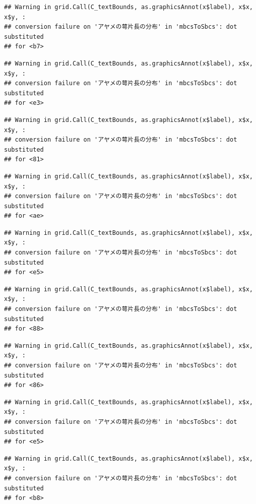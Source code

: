 \documentclass[
]{book}
\begin{document}
\begin{verbatim}
## Warning in grid.Call(C_textBounds, as.graphicsAnnot(x$label), x$x, x$y, :
## conversion failure on 'アヤメの萼片長の分布' in 'mbcsToSbcs': dot substituted
## for <b7>
\end{verbatim}

\begin{verbatim}
## Warning in grid.Call(C_textBounds, as.graphicsAnnot(x$label), x$x, x$y, :
## conversion failure on 'アヤメの萼片長の分布' in 'mbcsToSbcs': dot substituted
## for <e3>
\end{verbatim}

\begin{verbatim}
## Warning in grid.Call(C_textBounds, as.graphicsAnnot(x$label), x$x, x$y, :
## conversion failure on 'アヤメの萼片長の分布' in 'mbcsToSbcs': dot substituted
## for <81>
\end{verbatim}

\begin{verbatim}
## Warning in grid.Call(C_textBounds, as.graphicsAnnot(x$label), x$x, x$y, :
## conversion failure on 'アヤメの萼片長の分布' in 'mbcsToSbcs': dot substituted
## for <ae>
\end{verbatim}

\begin{verbatim}
## Warning in grid.Call(C_textBounds, as.graphicsAnnot(x$label), x$x, x$y, :
## conversion failure on 'アヤメの萼片長の分布' in 'mbcsToSbcs': dot substituted
## for <e5>
\end{verbatim}

\begin{verbatim}
## Warning in grid.Call(C_textBounds, as.graphicsAnnot(x$label), x$x, x$y, :
## conversion failure on 'アヤメの萼片長の分布' in 'mbcsToSbcs': dot substituted
## for <88>
\end{verbatim}

\begin{verbatim}
## Warning in grid.Call(C_textBounds, as.graphicsAnnot(x$label), x$x, x$y, :
## conversion failure on 'アヤメの萼片長の分布' in 'mbcsToSbcs': dot substituted
## for <86>
\end{verbatim}

\begin{verbatim}
## Warning in grid.Call(C_textBounds, as.graphicsAnnot(x$label), x$x, x$y, :
## conversion failure on 'アヤメの萼片長の分布' in 'mbcsToSbcs': dot substituted
## for <e5>
\end{verbatim}

\begin{verbatim}
## Warning in grid.Call(C_textBounds, as.graphicsAnnot(x$label), x$x, x$y, :
## conversion failure on 'アヤメの萼片長の分布' in 'mbcsToSbcs': dot substituted
## for <b8>
\end{verbatim}
\end{document}
